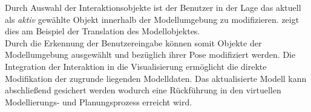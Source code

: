 Durch Auswahl der Interaktionsobjekte ist der Benutzer in der Lage das aktuell als \textit{aktiv} gewählte Objekt innerhalb der Modellumgebung zu modifizieren.  \red[(b)] zeigt dies am Beispiel der Translation des Modellobjektes. \\

Durch die Erkennung der Benutzereingabe können somit Objekte der Modellumgebung ausgewählt und bezüglich ihrer Pose modifiziert werden. Die Integration der Interaktion in die Visualisierung ermöglicht die direkte Modifikation der zugrunde liegenden Modelldaten. Das aktualisierte Modell kann abschließend gesichert werden wodurch eine Rückführung in den virtuellen Modellierungs- und Planungsprozess erreicht wird.


